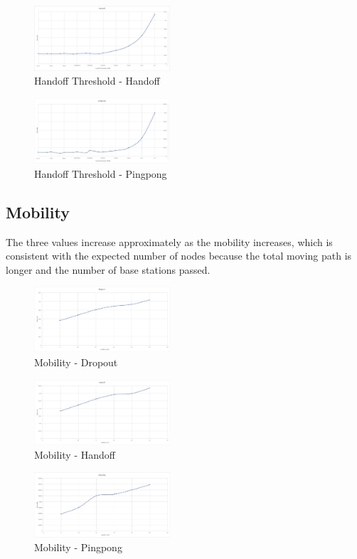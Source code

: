 \documentclass[a4paper]{IEEEtran}
\begin{document}
\begin{figure}[h]
    \centering
    \includegraphics[width=0.45\textwidth]{handoffthreshold/handoff}
    \caption{Handoff Threshold - Handoff}
    \label{fig:mesh2}
\end{figure}
\begin{figure}[h]
    \centering
    \includegraphics[width=0.45\textwidth]{handoffthreshold/pingpong}
    \caption{Handoff Threshold - Pingpong}
    \label{fig:mesh3}
\end{figure}
\subsection{Mobility}
The three values ​​increase approximately as the mobility increases, which is consistent with the expected number of nodes because the total moving path is longer and the number of base stations passed.
\begin{figure}[h]
    \centering
    \includegraphics[width=0.45\textwidth]{mobility/dropout}
    \caption{Mobility - Dropout}
    \label{fig:mesh4}
\end{figure}
\begin{figure}[h]
    \centering
    \includegraphics[width=0.45\textwidth]{mobility/handoff}
    \caption{Mobility - Handoff}
    \label{fig:mesh5}
\end{figure}
\begin{figure}[h]
    \centering
    \includegraphics[width=0.45\textwidth]{mobility/pingpong}
    \caption{Mobility - Pingpong}
    \label{fig:mesh6}
\end{figure}
\end{document}
